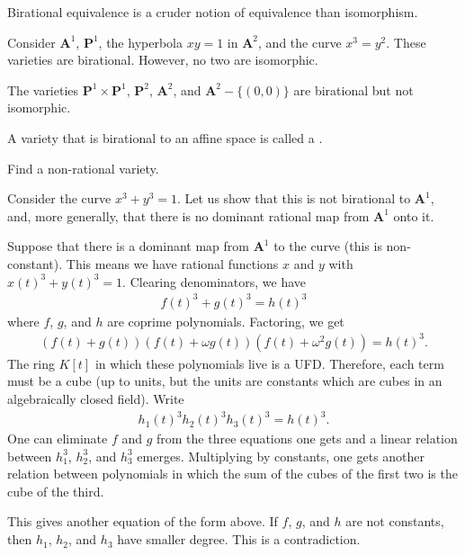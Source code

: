 \documentclass [11 pt, oneside] {article}
\begin{document}
\begin{remark}
	Birational equivalence is a cruder notion of equivalence than isomorphism.
\end{remark}

\begin{example}[ ]\label{}
Consider $\mathbf{A}^1$, $\mathbf{P}^1 $, the hyperbola $xy=1$ in $\mathbf{A}^2$, and the curve $x^3=y^2$. These varieties are birational. However, no two are isomorphic.

The varieties $\mathbf{P}^1\times \mathbf{P}^1$, $\mathbf{P}^2$, $\mathbf{A}^2$, and $\mathbf{A}^2-\{(0,0)\}$ are birational but not isomorphic.
\end{example}

\begin{remark}
	A variety that is birational to an affine space is called a .
\end{remark}

\begin{problem}
	Find a non-rational variety.
\end{problem}

\begin{example}[ ]\label{}
Consider the curve $x^3+y^3=1$. Let us show that this is not birational to $\mathbf{A}^1$, and, more generally, that there is no dominant rational map from $\mathbf{A}^1$ onto it. 

Suppose that there is a dominant map from $\mathbf{A}^1$ to the curve (this is non-constant). This means we have rational functions $x$ and $y$ with $x(t)^3+y (t)^3 =1$. Clearing denominators, we have 
\begin{align*}
	f(t)^3+g (t)^3=h (t)^3
\end{align*}
where $f$, $g$, and $h$ are coprime polynomials. Factoring, we get
\begin{align*}
	(f(t)+g (t)) (f(t)+\omega g (t)) (f(t) + \omega^2g (t)) = h(t)^3.
\end{align*}
The ring $K[t]$ in which these polynomials live is a UFD. Therefore, each term must be a cube (up to units, but the units are constants which are cubes in an algebraically closed field). Write
\begin{align*}
	h_1 (t)^3 h_2(t)^3  h_3(t)^3 = h (t)^3.
\end{align*}
One can eliminate $f$ and $g$ from the three equations one gets and a linear relation between $h_1^3$, $h_2^3$, and $h_3^3$ emerges. Multiplying by constants, one gets another relation between polynomials in which the sum of the cubes of the first two is the cube of the third. 

This gives another equation of the form above. If $f$, $g$, and $h$ are not constants, then $h_1$, $h_2$, and $h_3$ have smaller degree. This is a contradiction.
\end{example}
\end{document}
